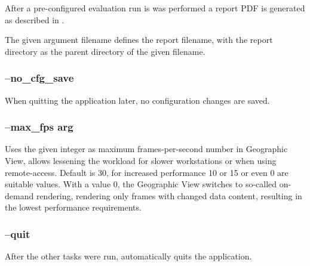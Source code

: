 After a pre-configured evaluation run is was performed a report PDF is generated as described in .

The given argument filename defines the report filename, with the report directory as the parent directory of the given filename.

\subsubsection{--no\_cfg\_save}

When quitting the application later, no configuration changes are saved.

\subsubsection{--max\_fps arg}

Uses the given integer as maximum frames-per-second number in Geographic View, allows lessening the workload for slower workstations or when using remote-access. Default is 30, for increased performance 10 or 15 or even 0 are suitable values. With a value 0, the Geographic View switches to so-called on-demand rendering, rendering only frames with changed data content, resulting in the lowest performance requirements.

\subsubsection{--quit}

After the other tasks were run, automatically quits the application.

